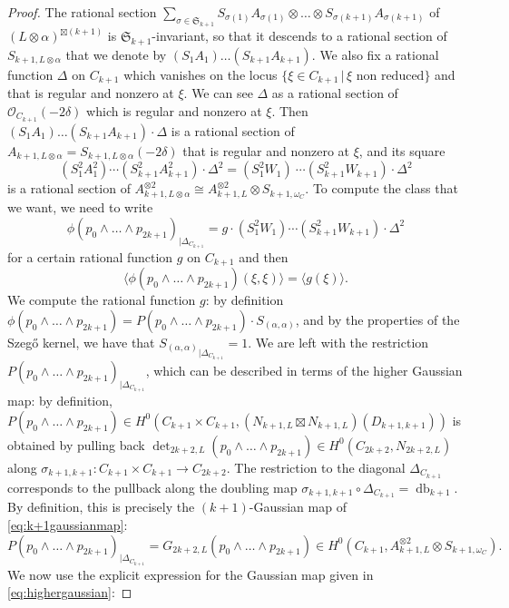 \documentclass[12pt]{amsart}
\numberwithin{equation}{section}
\numberwithin{thmcounter}{section}
\theoremstyle{definition}
\theoremstyle{claim}
\newcommand{\sO}{\mathscr{O}}
\begin{document}
\begin{proof}
	The rational section $\sum_{\sigma\in \mathfrak{S}_{k+1}} S_{\sigma(1)}A_{\sigma(1)} \otimes \dots \otimes S_{\sigma(k+1)}A_{\sigma(k+1)}$ of $(L\otimes \alpha)^{\boxtimes (k+1)}$ is $\mathfrak{S}_{k+1}$-invariant, so that it descends to a rational section of $S_{k+1,L\otimes \alpha}$ that we denote by $(S_1A_1)\dots  (S_{k+1}A_{k+1})$. We also fix a rational function $\Delta$ on $C_{k+1}$ which vanishes on the locus $\{\xi\in C_{k+1} \,|\, \xi \text{ non reduced}\}$ and that is regular and nonzero at $\xi$. We can see $\Delta$ as a rational section of $\sO_{C_{k+1}}(-2\delta)$ which is regular and nonzero at $\xi$. Then  $(S_1A_1)\dots (S_{k+1}A_{k+1})\cdot \Delta$ is a rational section of $A_{k+1,L\otimes\alpha} = S_{k+1,L\otimes \alpha}(-2\delta)$ that is regular and nonzero at $\xi$, and its square
	\[ (S^2_1A^2_1)\cdots (S^2_{k+1}A^2_{k+1})\cdot \Delta^2 = (S^2_1W_1)\ \cdots (S^2_{k+1}W_{k+1})\cdot \Delta^2 \]
	is a rational section of $A_{k+1,L\otimes\alpha}^{\otimes 2} \cong A_{k+1,L}^{\otimes 2}\otimes S_{k+1,\omega_C}$. To compute the class that we want, we need to write
	\[ \phi(p_0\wedge \dots \wedge p_{2k+1})_{|\Delta_{C_{k+1}}} = g\cdot (S^2_1W_1) \cdots (S^2_{k+1}W_{k+1})\cdot \Delta^2 \]
	for a certain rational function $g$ on $C_{k+1}$ and then
	\[ \langle \phi(p_0\wedge \dots \wedge p_{2k+1})(\xi,\xi) \rangle =  \langle g(\xi) \rangle .\]
	We compute the rational function $g$: by definition $\phi(p_0\wedge\dots \wedge p_{2k+1}) = P(p_0\wedge\dots\wedge p_{2k+1})\cdot S_{(\alpha,\alpha)}$, and by the properties of the Szeg\H{o} kernel, we have that ${S_{(\alpha,\alpha)}}_{|\Delta_{C_{k+1}}}=1$.  We are left with the restriction $P(p_0\wedge\dots \wedge p_{2k+1})_{|\Delta_{C_{k+1}}}$, which can be described in terms of the higher Gaussian map: by definition, $P(p_0\wedge \dots \wedge p_{2k+1}) \in H^0(C_{k+1}\times C_{k+1},(N_{k+1,L}\boxtimes N_{k+1,L})(D_{k+1,k+1}))$ is obtained by pulling back $\det_{2k+2,L}(p_0\wedge \dots \wedge p_{2k+1})\in H^0(C_{2k+2},N_{2k+2,L})$ along $\sigma_{k+1,k+1}\colon C_{k+1}\times C_{k+1}\to C_{2k+2}$. The restriction to the diagonal  $\Delta_{C_{k+1}}$ corresponds to the pullback along the doubling map $\sigma_{k+1,k+1}\circ \Delta_{C_{k+1}} = \operatorname{db}_{k+1}$. By definition, this is precisely the $(k+1)$-Gaussian map of \eqref{eq:k+1gaussianmap}:
	\[ P(p_0\wedge\dots \wedge p_{2k+1})_{|\Delta_{C_{k+1}}} = G_{2k+2,L}(p_0\wedge\dots\wedge p_{2k+1}) \in H^0(C_{k+1},A_{k+1,L}^{\otimes 2}\otimes S_{k+1,\omega_C}) . \]
	We now use the explicit expression for the Gaussian map given in \eqref{eq:highergaussian}:

\end{proof}
\end{document}
